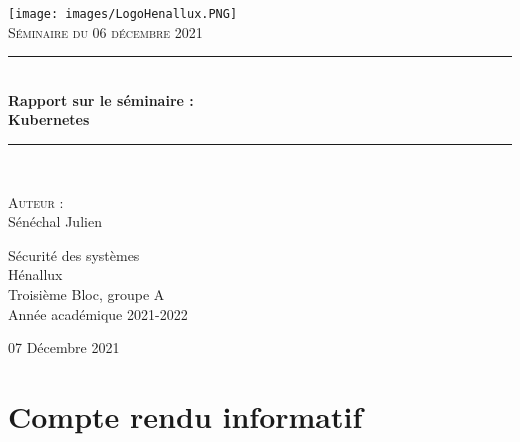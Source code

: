 \documentclass[a4paper]{article}
\newcommand{\HRule}{\rule{\linewidth}{0.5mm}}
\begin{document}
\begin{titlepage}
  \begin{sffamily}
  \begin{center}
    \texttt{[image: images/LogoHenallux.PNG]}~\\[1.5cm]
    \textsc{\Large Séminaire du 06 décembre 2021}\\[1.5cm]
    \HRule \\[0.4cm]
    { \huge \bfseries Rapport sur le séminaire :\\ Kubernetes\\[0.4cm] }
    \HRule \\[2cm]
    \begin{minipage}{0.4\textwidth}
      \begin{flushleft} \large
        \textsc{Auteur} :\\
        Sénéchal Julien\\
        

      \end{flushleft}
    \end{minipage}
    \begin{minipage}{0.55\textwidth}
      \begin{flushright} \large
		Sécurité des systèmes\\
		Hénallux\\
		Troisième Bloc, groupe A \\
		Année académique 2021-2022\\
      \end{flushright}
    \end{minipage}
    \vfill
    {\large 07 Décembre 2021}
  \end{center}
  \end{sffamily}
\end{titlepage}







\let\cleardoublepage\clearpage


\newpage
\section{Compte rendu informatif}
\end{document}

